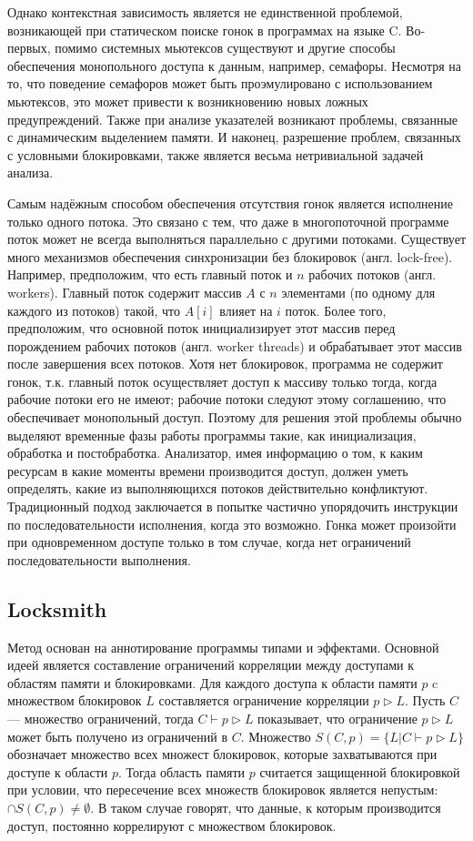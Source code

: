 Однако контекстная зависимость является не единственной проблемой, возникающей при статическом поиске гонок в программах на языке C. Во-первых, помимо системных мьютексов существуют и другие способы обеспечения монопольного доступа к данным, например, семафоры. Несмотря на то, что поведение семафоров может быть проэмулировано с использованием мьютексов, это может привести к возникновению новых ложных предупреждений. Также при анализе указателей возникают проблемы, связанные с динамическим выделением памяти. И наконец, разрешение проблем, связанных с условными блокировками, также является весьма нетривиальной задачей анализа.

Самым надёжным способом обеспечения отсутствия гонок является исполнение только одного потока. Это связано с тем, что даже в многопоточной программе поток может не всегда выполняться параллельно с другими потоками. Существует много механизмов обеспечения синхронизации без блокировок (англ. lock-free). Например, предположим, что есть главный поток и $n$ рабочих потоков (англ. workers). Главный поток содержит массив $A$ с $n$ элементами (по одному для каждого из потоков) такой, что $A[i]$ влияет на $i$  поток. Более того, предположим, что основной поток инициализирует этот массив перед порождением рабочих потоков (англ. worker threads) и обрабатывает этот массив после завершения всех потоков. Хотя нет блокировок, программа не содержит гонок, т.к. главный поток осуществляет доступ к массиву только тогда, когда рабочие потоки его не имеют; рабочие потоки следуют этому соглашению, что обеспечивает монопольный доступ. Поэтому для решения этой проблемы обычно выделяют временные фазы работы программы такие, как инициализация, обработка и постобработка. Анализатор, имея информацию о том, к каким ресурсам в какие моменты времени производится доступ, должен уметь определять, какие из выполняющихся потоков действительно конфликтуют. Традиционный подход заключается в попытке частично упорядочить инструкции по последовательности исполнения, когда это возможно. Гонка может произойти при одновременном доступе только в том случае, когда нет ограничений последовательности выполнения.

\subsection{Locksmith}

Метод основан на аннотирование программы типами и эффектами. Основной идеей является составление ограничений корреляции между доступами к областям памяти и блокировками. Для каждого доступа к области памяти $p$ c множеством блокировок $L$ составляется ограничение корреляции $p \triangleright L$. Пусть $C$  — множество ограничений, тогда $C \vdash p \triangleright L$ показывает, что ограничение $p \triangleright L$ может быть получено из ограничений в $C$. Множество $S(C, p) = \{L | C \vdash p \triangleright L\}$ обозначает множество всех множест блокировок, которые захватываются при доступе к области $p$. Тогда область памяти $p$ считается защищенной блокировкой при условии, что пересечение всех множеств блокировок является непустым: $\cap S(C, p) \neq \emptyset$. В таком случае говорят, что данные, к которым производится доступ, постоянно коррелируют с множеством блокировок.

